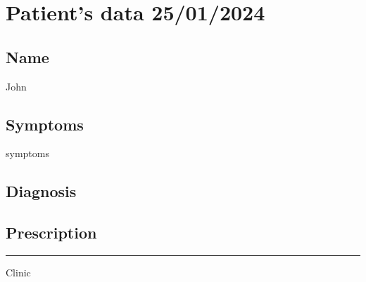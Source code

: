 \documentclass{article}%
\begin{document}
%
\normalsize%
\section{Patient's data 25/01/2024}%
\label{sec:Patientsdata25/01/2024}%
\subsection{Name}%
\label{subsec:Name}%
John

%
\subsection{Symptoms}%
\label{subsec:Symptoms}%
symptoms

%
\subsection{Diagnosis}%
\label{subsec:Diagnosis}%

%
\subsection{Prescription}%
\label{subsec:Prescription}%
\noindent\rule{\textwidth}{1pt}%
\newline%
Clinic

%
\end{document}
